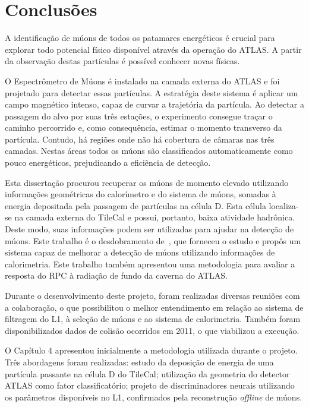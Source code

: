 \chapter{Conclusões}

A identificação de múons de todos os patamares energéticos é crucial para
explorar todo potencial físico disponível através da operação do ATLAS. A partir
da observação destas partículas é possível conhecer novas físicas.

O Espectrômetro de Múons é instalado na camada externa do ATLAS e foi projetado
para detectar essas partículas. A estratégia deste sistema é aplicar um campo
magnético intenso, capaz de curvar a trajetória da partícula. Ao detectar a
passagem do alvo por suas três estações, o experimento consegue traçar o
caminho percorrido e, como consequência, estimar o momento transverso da
partícula. Contudo, há regiões onde não há cobertura de câmaras nas três
camadas. Nestas áreas todos os múons são classificados automaticamente como
pouco energéticos, prejudicando a eficiência de detecção.

Esta dissertação procurou recuperar os múons de momento elevado utilizando
informações geométricas do calorímetro e do sistema de múons, somadas à energia
depositada pela passagem de partículas na célula D. Esta célula localiza-se na
camada externa do TileCal e possui, portanto, baixa atividade hadrônica. Deste
modo, suas informações podem ser utilizadas para ajudar na detecção de múons.
Este trabalho é o desdobramento de~\cite{CIODARO2012}, que forneceu o estudo e
propôs um sistema capaz de melhorar a detecção de múons utilizando informações
de calorimetria. Este trabalho também apresentou uma metodologia para avaliar a
resposta do RPC à radiação de fundo da caverna do ATLAS.

Durante o desenvolvimento deste projeto, foram realizadas diversas reuniões com
a colaboração, o que possibilitou o melhor entendimento em relação ao sistema de
filtragem do L1, à seleção de múons e ao sistema de calorimetria. Também foram
disponibilizados dados de colisão ocorridos em 2011, o que viabilizou a
execução.

O Capítulo 4 apresentou inicialmente a metodologia utilizada durante o projeto.
Três abordagens foram realizadas:  estudo da deposição de energia de uma
partícula passante na célula D do TileCal; utilização da geometria do detector
ATLAS como fator classificatório; projeto de discriminadores neurais
utilizando os parâmetros disponíveis no L1, confirmados pela reconstrução
\emph{offline} de múons.


